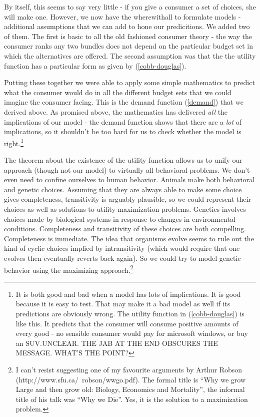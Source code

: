 \documentclass[12pt]{article}
\newcommand{\tmem}[1]{\textit{#1}}
\begin{document}
By itself, this seems to say very little - if you give a consumer a set of
choices, she will make one. However, we now have the wherewithall to formulate
models - additional assumptions that we can add to hone our predicitions. We
added two of them. The first is basic to all the old fashioned consumer theory
- the way the consumer ranks any two bundles does not depend on the particular
budget set in which the alternatives are offered. The second assumption was
that the the utility function has a particular form as given by
(\ref{cobb-douglas}).

Putting these together we were able to apply some simple mathematics to
predict what the consumer would do in all the different budget sets that we
could imagine the consumer facing. This is the demand function (\ref{demand})
that we derived above. As promised above, the mathematics has delivered
{\tmem{all}} the implications of our model - the demand function shows that
there are a {\tmem{lot}} of implications, so it shouldn't be too hard for us
to check whether the model is right.{\footnote{It is both good and bad when a
model has lots of implications. It is good because it is easy to test. That
may make it a bad model as well if its predictions are obviously wrong. The
utility function in (\ref{cobb-douglas}) is like this. It predicts that the
consumer will consume positive amounts of every good - no sensible consumer
would pay for microsoft windows, or buy an SUV.UNCLEAR. THE JAB AT THE END OBSCURES THE MESSAGE. WHAT'S THE POINT?}} 

The theorem about the existence of the utility function allows us to unify our
approach (though not our model) to virtually all behavioral problems. We don't
even need to confine ourselves to human behavior. Animals make both behavioral
and genetic choices. Assuming that they are always able to make some choice
gives completeness, transitivity is arguably plausible, so we could represent
their choices as well as solutions to utility maximization problems. Genetics
involves choices made by biological systems in response to changes in
environmental conditions. Completeness and transitivity of these choices are
both compelling. Completeness is immediate. The idea that organisms evolve
seems to rule out the kind of cyclic choices implied by intransitivity (which
would require that one evolves then eventually reverts back again). So we
could try to model genetic behavior using the maximizing approach.{\footnote{I
can't resist suggesting one of my favourite arguments by Arthur Robson
(http://www.sfu.ca/~robson/wwgo.pdf). The formal title is ``Why we grow Large
and then grow old: Biology, Economics and Mortality'', the informal
title of his talk was ``Why we Die''. Yes, it is the solution to a
maximization problem.}}
\end{document}
